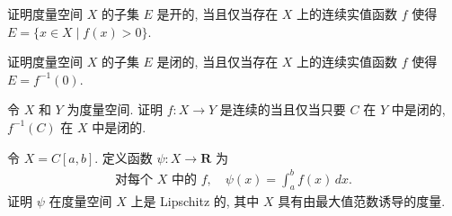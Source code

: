 \documentclass[../../main.tex]{subfiles}
\begin{document}
\begin{exercise}\label{exercise:ch09-34}
证明度量空间 $X$ 的子集 $E$ 是开的, 当且仅当存在 $X$ 上的连续实值函数 $f$ 使得 $E=\{x\in X\mid f(x)>0\}$.
\end{exercise}

\begin{exercise}\label{exercise:ch09-35}
证明度量空间 $X$ 的子集 $E$ 是闭的, 当且仅当存在 $X$ 上的连续实值函数 $f$ 使得 $E=f^{-1}(0)$.
\end{exercise}

\begin{exercise}\label{exercise:ch09-36}
令 $X$ 和 $Y$ 为度量空间. 证明 $f:X\to Y$ 是连续的当且仅当只要 $C$ 在 $Y$ 中是闭的, $f^{-1}(C)$ 在 $X$ 中是闭的.
\end{exercise}

\begin{exercise}\label{exercise:ch09-37}
令 $X=C[a,b]$. 定义函数 $\psi:X\to\mathbf{R}$ 为
\begin{align*}
\text{对每个 }X\text{ 中的 }f,\quad\psi(x)=\int_{a}^{b}f(x)\,dx.
\end{align*}
证明 $\psi$ 在度量空间 $X$ 上是 Lipschitz 的, 其中 $X$ 具有由最大值范数诱导的度量.
\end{exercise}
\end{document}
